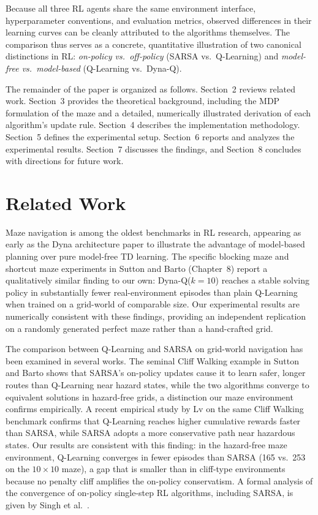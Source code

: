 \documentclass[11pt]{article}
\begin{document}
Because all three RL agents share the same environment interface,
hyperparameter conventions, and evaluation metrics, observed differences
in their learning curves can be cleanly attributed to the algorithms
themselves. The comparison thus serves as a concrete, quantitative
illustration of two canonical distinctions in RL: \emph{on-policy vs.\
off-policy} (SARSA vs.\ Q-Learning) and \emph{model-free vs.\
model-based} (Q-Learning vs.\ Dyna-Q).

The remainder of the paper is organized as follows. Section~2 reviews
related work. Section~3 provides the theoretical background, including the
MDP formulation of the maze and a detailed, numerically illustrated
derivation of each algorithm's update rule. Section~4 describes the
implementation methodology. Section~5 defines the experimental setup.
Section~6 reports and analyzes the experimental results. Section~7
discusses the findings, and Section~8 concludes with directions for future
work.

\section{Related Work}

Maze navigation is among the oldest benchmarks in RL research, appearing
as early as the Dyna architecture paper \cite{sutton1991dyna} to
illustrate the advantage of model-based planning over pure model-free
TD learning. The specific blocking maze and shortcut maze experiments in
Sutton and Barto \cite{sutton2018} (Chapter~8) report a qualitatively
similar finding to our own: Dyna-Q($k{=}10$) reaches a stable solving
policy in substantially fewer real-environment episodes than plain
Q-Learning when trained on a grid-world of comparable size. Our
experimental results are numerically consistent with these findings,
providing an independent replication on a randomly generated perfect maze
rather than a hand-crafted grid.

The comparison between Q-Learning and SARSA on grid-world navigation has
been examined in several works. The seminal Cliff Walking example in
Sutton and Barto \cite{sutton2018} shows that SARSA's on-policy updates
cause it to learn safer, longer routes than Q-Learning near hazard states,
while the two algorithms converge to equivalent solutions in hazard-free
grids, a distinction our maze environment confirms empirically. A recent
empirical study by Lv \cite{lv2024} on the same Cliff Walking benchmark
confirms that Q-Learning reaches higher cumulative rewards faster than
SARSA, while SARSA adopts a more conservative path near hazardous states.
Our results are consistent with this finding: in the hazard-free maze
environment, Q-Learning converges in fewer episodes than SARSA
(165 vs.\ 253 on the $10\times10$ maze), a gap that is smaller than in
cliff-type environments because no penalty cliff amplifies the on-policy
conservatism. A formal analysis of the convergence of on-policy single-step
RL algorithms, including SARSA, is given by Singh et al.\ \cite{singh2000}.
\end{document}
